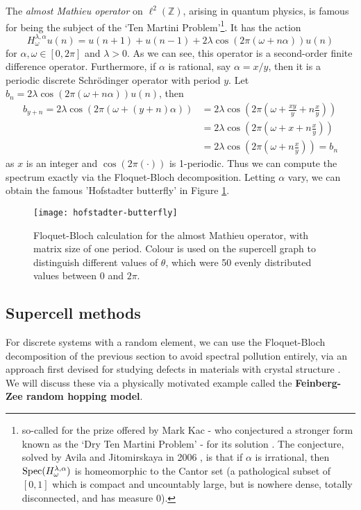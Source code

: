 \documentclass[../main.tex]{subfiles}
\begin{document}
\begin{example}
The \emph{almost Mathieu operator} on $\ell^2(\mathbb{Z})$, arising in quantum physics,
is famous for being the subject of the `Ten Martini Problem'\footnote{so-called
for the prize offered by Mark Kac - who conjectured a stronger form known as the
`Dry Ten Martini Problem' - for its solution \cite{simon1982almost}.
The conjecture, solved by Avila and Jitomirskaya in 2006 \cite{avila2006ten},
is that if $\alpha$ is irrational, then $\mathrm{Spec}(H_\omega^{\lambda, \alpha})$
is homeomorphic to the Cantor set (a pathological subset of $[0, 1]$ which is 
compact and uncountably large, but is nowhere dense, totally disconnected, and has measure 0).}.
It has the action
  $$H_\omega^{\lambda, \alpha} u(n) = u(n+1) + u(n-1) + 2\lambda \cos(2\pi (\omega + n \alpha))u(n)$$
for $\alpha, \omega \in [0, 2\pi]$ and $\lambda > 0$. As we can see, this
operator is a second-order finite difference operator. Furthermore, if
$\alpha$ is rational, say $\alpha = x/y$, then it is a periodic discrete
Schr\"odinger operator with period $y$.
Let $b_n = 2\lambda \cos(2\pi (\omega + n \alpha))u(n)$, then
\begin{align*} 
  b_{y+n} = 2\lambda \cos(2\pi (\omega + (y + n) \alpha)) 
	& = 2\lambda \cos(2\pi (\omega +  \frac{xy}{y} + n \frac{x}{y})) \\
  & = 2\lambda \cos(2\pi (\omega + x + n \frac{x}{y})) \\
  & = 2\lambda \cos(2\pi (\omega + n \frac{x}{y})) = b_n 
\end{align*}
  as $x$ is an integer and $\cos(2\pi(\cdot))$ is 1-periodic. Thus we can compute the
spectrum exactly via the Floquet-Bloch decomposition. Letting $\alpha$ vary, we can obtain
the famous 'Hofstadter butterfly' \cite{hofstadter1976energy} in Figure \ref{fig:hofstadter-butterfly}.

\begin{figure}[p!] \centering
\texttt{[image: hofstadter-butterfly]}
\caption{Floquet-Bloch calculation for the almost Mathieu operator, with matrix
	size of one period. Colour is used on the supercell graph to
	distinguish different values of $\theta$, which were 50 evenly
	distributed values between $0$ and $2 \pi$.}
\label{fig:hofstadter-butterfly}
\end{figure}
\clearpage
\end{example}

\subsection{Supercell methods} For discrete systems with
a random element, we can use the Floquet-Bloch decomposition of the previous
section to avoid spectral pollution entirely, via an approach first devised for
studying defects in materials with crystal structure
\cite{nieminen2007supercell}. We will discuss these via a physically motivated
example called the \textbf{Feinberg-Zee random hopping model}.
\end{document}
